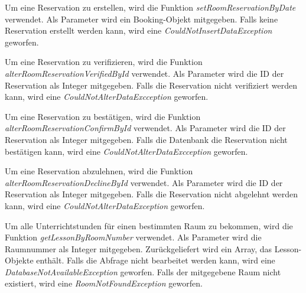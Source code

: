 

Um eine Reservation zu erstellen, wird die Funktion \emph{setRoomReservationByDate} verwendet. Als Parameter wird ein Booking-Objekt mitgegeben. Falls keine Reservation erstellt werden kann, wird eine \emph{CouldNotInsertDataException} geworfen. 



Um eine Reservation zu verifizieren, wird die Funktion \emph{alterRoomReservationVerifiedById} verwendet. Als Parameter wird die ID der Reservation als Integer mitgegeben. Falls die Reservation nicht verifiziert werden kann, wird eine \emph{CouldNotAlterDataExcception} geworfen.


Um eine Reservation zu bestätigen, wird die Funktion \emph{alterRoomReservationConfirmById} verwendet. Als Parameter wird die ID der Reservation als Integer mitgegeben. Falls die Datenbank die Reservation nicht bestätigen kann, wird eine \emph{CouldNotAlterDataExcception} geworfen. 


Um eine Reservation abzulehnen, wird die Funktion \emph{alterRoomReservationDeclineById} verwendet. Als Parameter wird die ID der Reservation als Integer mitgegeben. Falls die Reservation nicht abgelehnt werden kann, wird eine \emph{CouldNotAlterDataException} geworfen.



Um alle Unterrichtstunden für einen bestimmten Raum zu bekommen, wird die Funktion \emph{getLessonByRoomNumber} verwendet. Als Parameter wird die Raumnummer als Integer mitgegeben. Zurückgeliefert wird ein Array, das Lesson-Objekte enthält. Falls die Abfrage nicht bearbeitet werden kann, wird eine \emph{DatabaseNotAvailableException} geworfen. Falls der mitgegebene Raum nicht existiert, wird eine \emph{RoomNotFoundException} geworfen.

